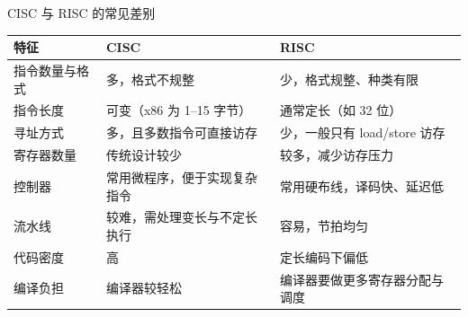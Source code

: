 \begin{tablebox}{CISC 与 RISC 的常见差别}
\centering
\small
\begin{tabularx}{\linewidth}{|p{2.9cm}|X|X|}
\hline
特征 & CISC & RISC \\
\hline
指令数量与格式 & 多，格式不规整 & 少，格式规整、种类有限 \\
指令长度 & 可变（x86 为 1--15 字节） & 通常定长（如 32 位）\\
寻址方式 & 多，且多数指令可直接访存 & 少，一般只有 load/store 访存 \\
寄存器数量 & 传统设计较少 & 较多，减少访存压力 \\
控制器 & 常用微程序，便于实现复杂指令 & 常用硬布线，译码快、延迟低 \\
流水线 & 较难，需处理变长与不定长执行 & 容易，节拍均匀 \\
代码密度 & 高 & 定长编码下偏低 \\
编译负担 & 编译器较轻松 & 编译器要做更多寄存器分配与调度 \\
\hline
\end{tabularx}
\end{tablebox}

